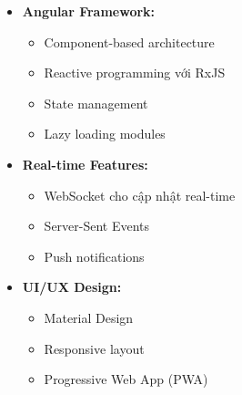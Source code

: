 \begin{itemize}
    \item \textbf{Angular Framework:}
    \begin{itemize}
        \item Component-based architecture
        \item Reactive programming với RxJS
        \item State management
        \item Lazy loading modules
    \end{itemize}
    
    \item \textbf{Real-time Features:}
    \begin{itemize}
        \item WebSocket cho cập nhật real-time
        \item Server-Sent Events
        \item Push notifications
    \end{itemize}
    
    \item \textbf{UI/UX Design:}
    \begin{itemize}
        \item Material Design
        \item Responsive layout
        \item Progressive Web App (PWA)
    \end{itemize}
\end{itemize} 
